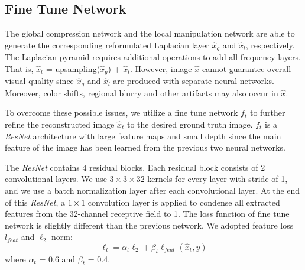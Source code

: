\documentclass[journal]{IEEEtran}
\begin{document}
\subsection{Fine Tune Network}
The global compression network and the local manipulation network are able to generate the corresponding reformulated Laplacian layer $\hat{x}_g$ and $\hat{x}_l$, respectively. The Laplacian pyramid requires additional operations to add all frequency layers. That is, $\hat{x}_t$ = upsampling($\hat{x}_g$) + $\hat{x}_l$.  However, image $\hat{x}$ cannot guarantee overall visual quality since $\hat{x}_g$ and $\hat{x}_l$ are produced with separate neural networks. Moreover, color shifts, regional blurry and other artifacts may also occur in $\hat{x}$.

To overcome these possible issues, we utilize a fine tune network $f_t$ to further refine the reconstructed image $\hat{x}_t$ to the desired ground truth image. 
$f_t$ is a \textit{ResNet} architecture with large feature maps and small depth since the main feature of the image has been learned from the  previous two neural networks. 

The \textit{ResNet} contains 4 residual blocks.  Each residual block consists of 2 convolutional layers.  We use $3 \times 3 \times 32$ kernels for every layer with stride of 1, and we use a batch normalization layer after each convolutional layer.  At the end of this \textit{ResNet}, a $1 \times 1$ convolution layer is applied to condense all extracted features from the 32-channel receptive field to 1. 
The loss function of fine tune network is slightly different than the previous network.  We adopted feature loss $l_{feat}$ and $\ell_2$-norm:
\begin{equation}
    \ell_t = \alpha_t \ell_2 + \beta_t \ell_{feat}(\hat{x}_t, y)
\end{equation}
where $\alpha_t$ = 0.6 and $\beta_t$ = 0.4.  



\end{document}

